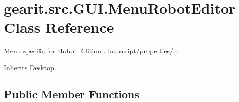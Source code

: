 \hypertarget{classgearit_1_1src_1_1_g_u_i_1_1_menu_robot_editor}{\section{gearit.\+src.\+G\+U\+I.\+Menu\+Robot\+Editor Class Reference}
\label{classgearit_1_1src_1_1_g_u_i_1_1_menu_robot_editor}
}


Menu specific for Robot Edition \+: lua script/properties/...  




Inherits Desktop.

\subsection*{Public Member Functions}
